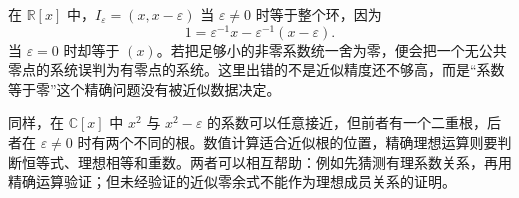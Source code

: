 在 \(\mathbb R[x]\) 中，\(I_\varepsilon=(x,x-\varepsilon)\) 当 \(\varepsilon\ne0\) 时等于整个环，因为
\[
	1=\varepsilon^{-1}x-\varepsilon^{-1}(x-\varepsilon).
\]
当 \(\varepsilon=0\) 时却等于 \((x)\)。若把足够小的非零系数统一舍为零，便会把一个无公共零点的系统误判为有零点的系统。这里出错的不是近似精度还不够高，而是“系数等于零”这个精确问题没有被近似数据决定。

\ProseParagraphBreak
同样，在 \(\mathbb C[x]\) 中 \(x^2\) 与 \(x^2-\varepsilon\) 的系数可以任意接近，但前者有一个二重根，后者在 \(\varepsilon\ne0\) 时有两个不同的根。数值计算适合近似根的位置，精确理想运算则要判断恒等式、理想相等和重数。两者可以相互帮助：例如先猜测有理系数关系，再用精确运算验证；但未经验证的近似零余式不能作为理想成员关系的证明。
